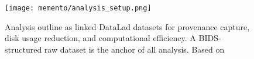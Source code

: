 \begin{figure}
	\centering
	\texttt{[image: memento/analysis\_setup.png]}
	\caption[Memento analysis outline]{Analysis outline as linked DataLad datasets for provenance capture, disk usage reduction, and computational efficiency. A \gls{BIDS}-structured raw dataset is the anchor of all analysis. Based on }
	\label{fig:outline_memento}
\end{figure}
%
%
%
